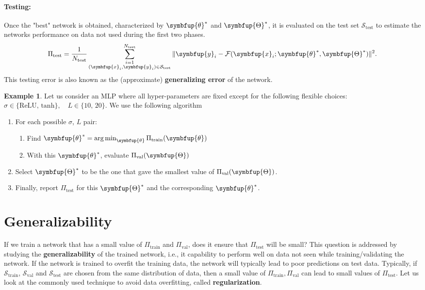 \documentclass[11pt]{extarticle}
\newcommand{\ds}{\displaystyle}
\newcommand{\vx}{\symbfup{x}}
\newcommand{\vy}{\symbfup{y}}
\theoremstyle{definition}
\newcommand{\btheta}{\symbfup{\theta}}
\newcommand{\Hp}{\symbfup{\Theta}}
\DeclareMathOperator*{\amin}{\rm{\arg \min}}
\newtheorem{example}{Example}%
\begin{document}
\paragraph{Testing:} Once the "best" network is obtained, characterized by $\btheta^*$ and $\Hp^*$, it is evaluated on the test set $\mathcal{S}_\text{test}$ to estimate the networks performance on data not used during the first two phases. 
\begin{align*}
  \Pi_\text{test} = \frac{1}{N_\text{test}} \sum_{\substack{i=1\\(\vx_i,\vy_i) \in \mathcal{S}_{\text{test}}}}^{N_\text{test}} \|\vy_i - \mathcal{F}(\vx_i; \btheta^*, \Hp^*)\|^2.
\end{align*}
This testing error is also known as the (approximate) \textbf{generalizing error} of the network.

\begin{example}
  Let us consider an MLP where all hyper-parameters are fixed except for the following flexible choices: $\ds\sigma \in \{\text{ReLU, tanh}\}, \quad L \in \{10,\,20\}$. We use the following algorithm
\begin{enumerate}
  \item For each possible $\sigma$, $L$ pair:
    \begin{enumerate}
      \item Find $\btheta^* = \amin_{\btheta} \Pi_\text{train}(\btheta)$
      \item With this $\btheta^*$, evaluate $\Pi_\text{val}(\Hp)$
    \end{enumerate}
  \item Select $\Hp^*$ to be the one that gave the smallest value of $\Pi_\text{val}(\Hp)$.	
  \item Finally, report $\Pi_\text{test}$ for this $\Hp^*$ and the corresponding $\btheta^*$.
\end{enumerate}
\end{example}

\section*{Generalizability} 
If we train a network that has a small value of $\Pi_\text{train}$ and $\Pi_\text{val}$, does it ensure that $\Pi_\text{test}$ will be small? This question is addressed by studying the \textbf{generalizability} of the trained network, i.e., it capability to perform well on data not seen while training/validating the network. If the network is trained to overfit the training data, the network will typically lead to poor predictions on test data. Typically, if $\mathcal{S}_\text{train}$, $\mathcal{S}_\text{val}$ and $\mathcal{S}_\text{test}$ are chosen from the same distribution of data, then a small value of $\Pi_\text{train},\Pi_\text{val}$ can lead to small values of $\Pi_\text{test}$. Let us look at the commonly used technique to avoid data overfitting, called \textbf{regularization}.
\end{document}
